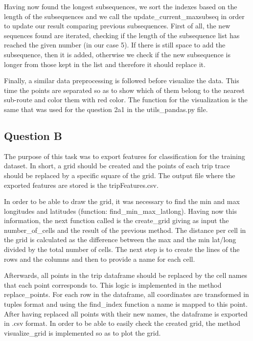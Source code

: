 \documentclass[12pt]{article}
\begin{document}
	Having now found the longest subsequences, we sort the indexes based on the length of the subsequences and we call the update\_current\_maxsubseq in order to update our result comparing previous subsequences. First of all, the new sequences found are iterated, checking if the length of the subsequence list has reached the given number (in our case 5). If there is still space to add the subsequence, then it is added, otherwise we check if the new subsequence is longer from those kept in the list and therefore it should replace it.
	
	Finally, a similar data preprocessing is followed before visualize the data. This time the points are separated so as to show which of them belong to the nearest sub-route and color them with red color. The function for the visualization is the same that was used for the question 2a1 in the utils\_pandas.py file.
	
	\subsection{Question B}
	The purpose of this task was to export features for classification for the training dataset. In short, a grid should be created and the points of each trip trace should be replaced by a specific square of the grid. The output file where the exported features are stored is the tripFeatures.csv.
	
	In order to be able to draw the grid, it was necessary to find the min and max longitudes and latitudes (function: find\_min\_max\_latlong). Having now this information, the next function called is the create\_grid giving as input the number\_of\_cells and the result of the previous method. The distance per cell in the grid is calculated as the difference between the max and the min lat/long divided by the total number of cells. The next step is to create the lines of the rows and the columns and then to provide a name for each cell.
	
	Afterwards, all points in the trip dataframe should be replaced by the cell names that each point corresponds to. This logic is implemented in the method replace\_points. For each row in the dataframe, all coordinates are transformed in tuples format and using the find\_index function a name is mapped to this point. After having replaced all points with their new names, the dataframe is exported in .csv format. In order to be able to easily check the created grid, the method visualize\_grid is implemented so as to plot the grid. 
	
\end{document}
